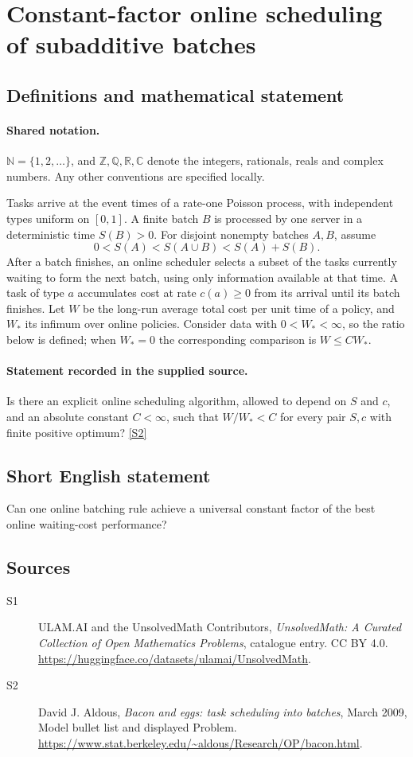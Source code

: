 \documentclass[11pt]{article}
\newcommand{\sref}[2]{\hyperlink{source:#1:#2}{[S#2]}}
\begin{document}
\section{Constant-factor online scheduling of subadditive batches}\label{statement}

\subsection{Definitions and mathematical statement}

\paragraph{Shared notation.}$\mathbb N=\{1,2,\ldots\}$, and $\mathbb Z,\mathbb Q,\mathbb R,\mathbb C$ denote the integers, rationals, reals and complex numbers. Any other conventions are specified locally.


Tasks arrive at the event times of a rate-one Poisson process, with independent types uniform on $[0,1]$. A finite batch $B$ is processed by one server in a deterministic time $S(B)>0$. For disjoint nonempty batches $A,B$, assume
\[0<S(A)<S(A\cup B)<S(A)+S(B).\]
After a batch finishes, an online scheduler selects a subset of the tasks currently waiting to form the next batch, using only information available at that time. A task of type $a$ accumulates cost at rate $c(a)\ge0$ from its arrival until its batch finishes. Let $W$ be the long-run average total cost per unit time of a policy, and $W_*$ its infimum over online policies. Consider data with $0<W_*<\infty$, so the ratio below is defined; when $W_*=0$ the corresponding comparison is $W\le C W_*$.
\paragraph{Statement recorded in the supplied source.}
Is there an explicit online scheduling algorithm, allowed to depend on $S$ and $c$, and an absolute constant $C<\infty$, such that $W/W_*<C$ for every pair $S,c$ with finite positive optimum? \sref{statement}{2}
\subsection{Short English statement}
Can one online batching rule achieve a universal constant factor of the best online waiting-cost performance?
\subsection{Sources}
\begin{description}
\item[\hypertarget{source:statement:1}{S1}] ULAM.AI and the UnsolvedMath Contributors, \emph{UnsolvedMath: A Curated Collection of Open Mathematics Problems}, catalogue entry. CC BY 4.0. \url{https://huggingface.co/datasets/ulamai/UnsolvedMath}.
\item[\hypertarget{source:statement:2}{S2}] David J. Aldous, \emph{Bacon and eggs: task scheduling into batches}, March 2009, Model bullet list and displayed Problem. \url{https://www.stat.berkeley.edu/~aldous/Research/OP/bacon.html}.
\end{description}
\label{end:statement}
\end{document}

